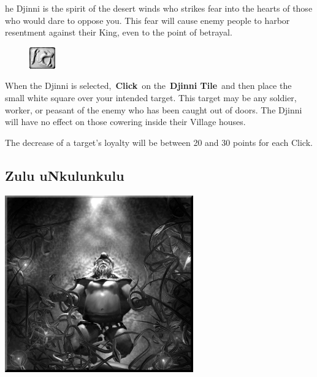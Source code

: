 he Djinni is the spirit of the desert winds who strikes fear into the hearts of those who would dare to oppose you. This fear will cause enemy people to harbor resentment against their King, even to the point of betrayal.

\begin{figure}
	\vspace{-20pt}
	\begin{center}
		\includegraphics[width=0.1\textwidth]{Tdjinni}
	\end{center}
	\vspace{-20pt}
\end{figure}

When the Djinni is selected, \textbf{Click} on the \textbf{Djinni Tile} and then place the small white square over your intended target. This target may be any soldier, worker, or peasant of the enemy who has been caught out of doors. The Djinni will have no effect on those cowering inside their Village houses.

The decrease of a target's loyalty will be between 20 and 30 points for each Click.

\subsection{Zulu uNkulunkulu}


\begin{center}
	\includegraphics[width=1\linewidth]{Aoldone}
\end{center}

